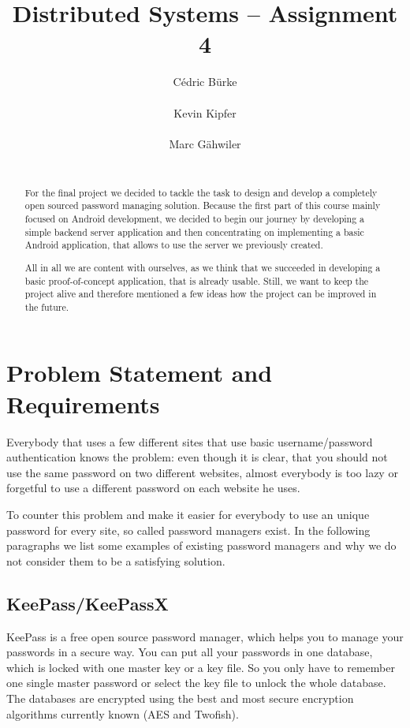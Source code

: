 \documentclass{report}
\title{Distributed Systems -- Assignment 4}
\author{
%
%
\alignauthor C\'edric B\"urke\\
	\affaddr{ETH ID 08-918-120}\\
	\email{cbuerke@student.ethz.ch}
\alignauthor Kevin Kipfer\\
	\affaddr{ETH ID 09-929-993}\\
	\email{kkipfer@student.ethz.ch}
\alignauthor Marc G\"ahwiler\\
	\affaddr{ETH ID 10-927-796}\\
	\email{gamarc@student.ethz.ch}
}
\begin{document}
\maketitle

\begin{abstract}
For the final project we decided to tackle the task to design and develop a completely open sourced password managing solution. Because the first part of this course mainly focused on Android development, we decided to begin our journey by developing a simple backend server application and then concentrating on implementing a basic Android application, that allows to use the server we previously created.

All in all we are content with ourselves, as we think that we succeeded in developing a basic proof-of-concept application, that is already usable. Still, we want to keep the project alive and therefore mentioned a few ideas how the project can be improved in the future.
\end{abstract}

\section{Problem Statement and Requirements}
Everybody that uses a few different sites that use basic username/password authentication knows the problem: even though it is clear, that you should not use the same password on two different websites, almost everybody is too lazy or forgetful to use a different password on each website he uses.

To counter this problem and make it easier for everybody to use an unique password for every site, so called password managers exist. In the following paragraphs we list some examples of existing password managers and why we do not consider them to be a satisfying solution.

\subsection{KeePass/KeePassX}
KeePass is a free open source password manager, which helps you to manage your passwords in a secure way. You can put all your passwords in one database, which is locked with one master key or a key file. So you only have to remember one single master password or select the key file to unlock the whole database. The databases are encrypted using the best and most secure encryption algorithms currently known (AES and Twofish). \cite{KeePass}
\end{document}
